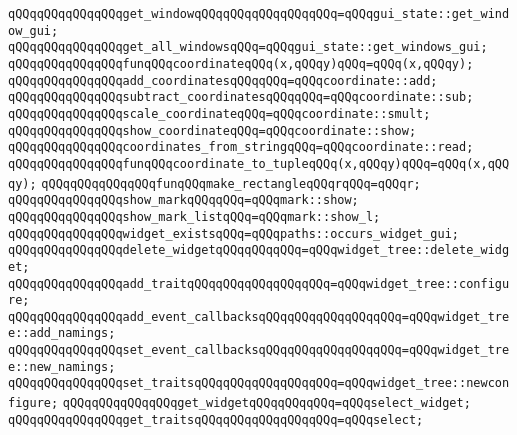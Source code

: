\newline
\verb|qQQqqQQqqQQqqQQqget_windowqQQqqQQqqQQqqQQqqQQq=qQQqgui_state::get_window_gui;|\newline
\verb|qQQqqQQqqQQqqQQqget_all_windowsqQQq=qQQqgui_state::get_windows_gui;|\newline
\newline
\verb|qQQqqQQqqQQqqQQqfunqQQqcoordinateqQQq(x,qQQqy)qQQq=qQQq(x,qQQqy);|\newline
\verb|qQQqqQQqqQQqqQQqadd_coordinatesqQQqqQQq=qQQqcoordinate::add;|\newline
\verb|qQQqqQQqqQQqqQQqsubtract_coordinatesqQQqqQQq=qQQqcoordinate::sub;|\newline
\verb|qQQqqQQqqQQqqQQqscale_coordinateqQQq=qQQqcoordinate::smult;|\newline
\verb|qQQqqQQqqQQqqQQqshow_coordinateqQQq=qQQqcoordinate::show;|\newline
\verb|qQQqqQQqqQQqqQQqcoordinates_from_stringqQQq=qQQqcoordinate::read;|\newline
\verb|qQQqqQQqqQQqqQQqfunqQQqcoordinate_to_tupleqQQq(x,qQQqy)qQQq=qQQq(x,qQQqy);|\newline
\verb|qQQqqQQqqQQqqQQqfunqQQqmake_rectangleqQQqrqQQq=qQQqr;|\newline
\newline
\verb|qQQqqQQqqQQqqQQqshow_markqQQqqQQq=qQQqmark::show;|\newline
\verb|qQQqqQQqqQQqqQQqshow_mark_listqQQq=qQQqmark::show_l;|\newline
\newline
\verb|qQQqqQQqqQQqqQQqwidget_existsqQQq=qQQqpaths::occurs_widget_gui;|\newline
\verb|qQQqqQQqqQQqqQQqdelete_widgetqQQqqQQqqQQq=qQQqwidget_tree::delete_widget;|\newline
\verb|qQQqqQQqqQQqqQQqadd_traitqQQqqQQqqQQqqQQqqQQq=qQQqwidget_tree::configure;|\newline
\verb|qQQqqQQqqQQqqQQqadd_event_callbacksqQQqqQQqqQQqqQQqqQQq=qQQqwidget_tree::add_namings;|\newline
\verb|qQQqqQQqqQQqqQQqset_event_callbacksqQQqqQQqqQQqqQQqqQQq=qQQqwidget_tree::new_namings;|\newline
\verb|qQQqqQQqqQQqqQQqset_traitsqQQqqQQqqQQqqQQqqQQq=qQQqwidget_tree::newconfigure;|\newline
\newline
\verb|qQQqqQQqqQQqqQQqget_widgetqQQqqQQqqQQq=qQQqselect_widget;|\newline
\verb|qQQqqQQqqQQqqQQqget_traitsqQQqqQQqqQQqqQQqqQQq=qQQqselect;|\newline
